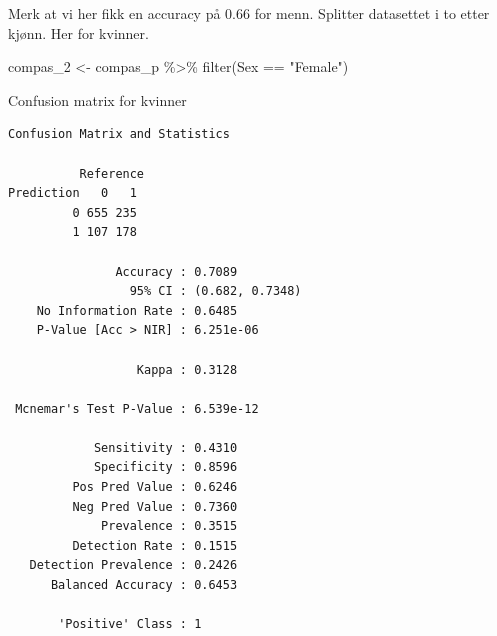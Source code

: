 \documentclass[
  letterpaper,
  DIV=11,
  numbers=noendperiod]{scrreprt}
\newenvironment{Shaded}{\begin{snugshade}}{\end{snugshade}}
\newcommand{\AttributeTok}[1]{\textcolor[rgb]{0.40,0.45,0.13}{#1}}
\newcommand{\FunctionTok}[1]{\textcolor[rgb]{0.28,0.35,0.67}{#1}}
\newcommand{\NormalTok}[1]{\textcolor[rgb]{0.00,0.23,0.31}{#1}}
\newcommand{\OtherTok}[1]{\textcolor[rgb]{0.00,0.23,0.31}{#1}}
\newcommand{\SpecialCharTok}[1]{\textcolor[rgb]{0.37,0.37,0.37}{#1}}
\newcommand{\StringTok}[1]{\textcolor[rgb]{0.13,0.47,0.30}{#1}}
\begin{document}
Merk at vi her fikk en accuracy på 0.66 for menn. Splitter datasettet i
to etter kjønn. Her for kvinner.

\begin{Shaded}
\begin{Highlighting}[]
\NormalTok{compas\_2 }\OtherTok{\textless{}{-}}\NormalTok{ compas\_p }\SpecialCharTok{\%\textgreater{}\%} 
  \FunctionTok{filter}\NormalTok{(Sex }\SpecialCharTok{==} \StringTok{"Female"}\NormalTok{)}
\end{Highlighting}
\end{Shaded}

Confusion matrix for kvinner

\begin{Shaded}
\end{Shaded}

\begin{verbatim}
Confusion Matrix and Statistics

          Reference
Prediction   0   1
         0 655 235
         1 107 178
                                         
               Accuracy : 0.7089         
                 95% CI : (0.682, 0.7348)
    No Information Rate : 0.6485         
    P-Value [Acc > NIR] : 6.251e-06      
                                         
                  Kappa : 0.3128         
                                         
 Mcnemar's Test P-Value : 6.539e-12      
                                         
            Sensitivity : 0.4310         
            Specificity : 0.8596         
         Pos Pred Value : 0.6246         
         Neg Pred Value : 0.7360         
             Prevalence : 0.3515         
         Detection Rate : 0.1515         
   Detection Prevalence : 0.2426         
      Balanced Accuracy : 0.6453         
                                         
       'Positive' Class : 1              
                                         
\end{verbatim}
\end{document}
